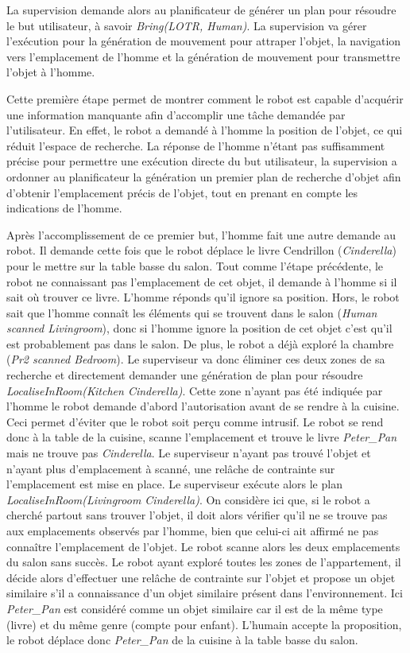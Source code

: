 \documentclass[a4paper,11pt,twoside]{StyleThese}
\begin{document}
La supervision demande alors au planificateur de générer un plan pour résoudre le but utilisateur, à savoir \textit{Bring(LOTR, Human)}.
La supervision va gérer l'exécution pour la génération de mouvement pour attraper l'objet, la navigation vers l'emplacement de l'homme et la génération de mouvement pour transmettre l'objet à l'homme.

Cette première étape permet de montrer comment le robot est capable d'acquérir une information manquante afin d'accomplir une tâche demandée par l'utilisateur. En effet, le robot a demandé à l'homme la position de l'objet, ce qui réduit l'espace de recherche. La réponse de l'homme n'étant pas suffisamment précise pour permettre une exécution directe du but utilisateur, la supervision a ordonner au planificateur la génération un premier plan de recherche d'objet afin d'obtenir l'emplacement précis de l'objet, tout en prenant en compte les indications de l'homme.

Après l'accomplissement de ce premier but, l'homme fait une autre demande au robot. Il demande cette fois que le robot déplace le livre Cendrillon (\textit{Cinderella}) pour le mettre sur la table basse du salon.
Tout comme l'étape précédente, le robot ne connaissant pas l'emplacement de cet objet, il demande à l'homme si il sait où trouver ce livre.
L'homme réponds qu'il ignore sa position.
Hors, le robot sait que l'homme connaît les éléments qui se trouvent dans le salon (\textit{Human scanned  Livingroom}), donc si l'homme ignore la position de cet objet c'est qu'il est probablement pas dans le salon. De plus, le robot a déjà exploré la chambre (\textit{Pr2 scanned Bedroom}). Le superviseur va donc éliminer ces deux zones de sa recherche et directement demander une génération de plan pour résoudre \textit{LocaliseInRoom(Kitchen Cinderella)}. Cette zone n'ayant pas été indiquée par l'homme le robot demande d'abord l'autorisation avant de se rendre à la cuisine. Ceci permet d'éviter que le robot soit perçu comme intrusif.
Le robot se rend donc à la table de la cuisine, scanne l'emplacement et trouve le livre \textit{Peter\_Pan} mais ne trouve pas \textit{Cinderella}.
Le superviseur n'ayant pas trouvé l'objet et n'ayant plus d'emplacement à scanné, une relâche de contrainte sur l'emplacement est mise en place.
Le superviseur exécute alors le plan \textit{LocaliseInRoom(Livingroom Cinderella)}. On considère ici que, si le robot a cherché partout sans trouver l'objet, il doit alors vérifier qu'il ne se trouve pas aux emplacements observés par l'homme, bien que celui-ci ait affirmé ne pas connaître l'emplacement de l'objet.
Le robot scanne alors les deux emplacements du salon sans succès.
Le robot ayant exploré toutes les zones de l'appartement, il décide alors d'effectuer une relâche de contrainte sur l'objet et propose un objet similaire s'il a connaissance d'un objet similaire présent dans l'environnement.
Ici \textit{Peter\_Pan} est considéré comme un objet similaire car il est de la même type (livre) et du même genre (compte pour enfant).
L'humain accepte la proposition, le robot déplace donc \textit{Peter\_Pan} de la cuisine à la table basse du salon.
\end{document}
